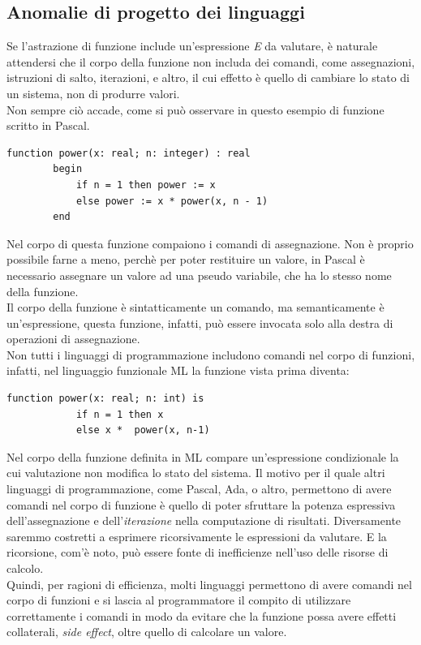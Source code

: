\documentclass[12pt]{report}
\begin{document}
 	\subsection{Anomalie di progetto dei linguaggi}
 	Se l'astrazione di funzione include un'espressione \textit{E} da valutare, è naturale attendersi che il corpo della funzione non includa dei comandi, come assegnazioni, istruzioni di salto, iterazioni, e altro, il cui effetto è quello di cambiare lo stato di un sistema, non di produrre valori.  \\
 	Non sempre ciò accade, come si può osservare in questo esempio di funzione scritto in Pascal.
 	\begin{lstlisting}[style=pascalstyle]
 		function power(x: real; n: integer) : real
 		begin
 			if n = 1 then power := x
 			else power := x * power(x, n - 1)
 		end
 	\end{lstlisting}
 	Nel corpo di questa funzione compaiono i comandi di assegnazione. Non è proprio possibile farne a meno, perchè per poter restituire un valore, in Pascal è necessario assegnare un valore ad una pseudo variabile, che ha lo stesso nome della funzione. \\
 	Il corpo della funzione è sintatticamente un comando, ma semanticamente è un'espressione, questa funzione, infatti, può essere invocata solo alla destra di operazioni di assegnazione. \\
 	Non tutti i linguaggi di programmazione includono comandi nel corpo di funzioni, infatti, nel linguaggio funzionale ML la funzione vista prima diventa:
 	\begin{lstlisting}[style=mlstyle]
 		function power(x: real; n: int) is
 			if n = 1 then x
 			else x *  power(x, n-1)
 	\end{lstlisting}
 	Nel corpo della funzione definita in ML compare un'espressione condizionale la cui valutazione non modifica lo stato del sistema. Il motivo per il quale altri linguaggi di programmazione, come Pascal, Ada, o altro, permettono di avere comandi nel corpo di funzione è quello di poter sfruttare la potenza espressiva dell'assegnazione e dell'\textit{iterazione} nella computazione di risultati. Diversamente saremmo costretti a esprimere ricorsivamente le espressioni da valutare. E la ricorsione, com'è noto, può essere fonte di inefficienze nell'uso delle risorse di calcolo. \\
 	Quindi, per ragioni di efficienza, molti linguaggi permettono di avere comandi nel corpo di funzioni e si lascia al programmatore il compito di utilizzare correttamente i comandi in modo da evitare che la funzione possa avere effetti collaterali, \textit{side effect}, oltre quello di calcolare un valore.  \\
\end{document}
